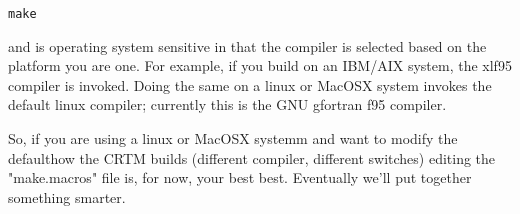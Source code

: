 \quad\texttt{make}

and is operating system sensitive in that the compiler is selected based on the platform you are one. For example, if you build on an IBM/AIX system, the xlf95 compiler is invoked. Doing the same on a linux or MacOSX system invokes the default linux compiler; currently this is the GNU gfortran f95 compiler.

So, if you are using a linux or MacOSX systemm and want to modify the defaulthow the CRTM builds (different compiler, different switches) editing the "make.macros" file is, for now, your best best. Eventually we'll put together something smarter.

%
%
%
%
%
%
%
%
%
%

